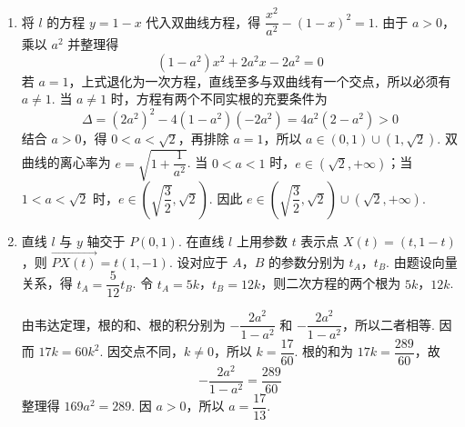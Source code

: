 \begin{solution}
\begin{enumerate}
\item 将 \(l\) 的方程 \(y=1-x\) 代入双曲线方程，得 \(\dfrac{x^2}{a^2}-(1-x)^2=1\). 由于 \(a>0\)，乘以 \(a^2\) 并整理得
\[
(1-a^2)x^2+2a^2x-2a^2=0
\]
若 \(a=1\)，上式退化为一次方程，直线至多与双曲线有一个交点，所以必须有 \(a\ne1\). 当 \(a\ne1\) 时，方程有两个不同实根的充要条件为
\[
\Delta=(2a^2)^2-4(1-a^2)(-2a^2)=4a^2(2-a^2)>0
\]
结合 \(a>0\)，得 \(0<a<\sqrt2\)，再排除 \(a=1\)，所以 \(a\in(0,1)\cup(1,\sqrt2)\). 双曲线的离心率为 \(e=\sqrt{1+\dfrac1{a^2}}\). 当 \(0<a<1\) 时，\(e\in(\sqrt2,+\infty)\)；当 \(1<a<\sqrt2\) 时，\(e\in\left(\sqrt{\dfrac32},\sqrt2\right)\). 因此 \(e\in\left(\sqrt{\dfrac32},\sqrt2\right)\cup\left(\sqrt2,+\infty\right)\).
\item 直线 \(l\) 与 \(y\) 轴交于 \(P(0,1)\). 在直线 \(l\) 上用参数 \(t\) 表示点 \(X(t)=(t,1-t)\)，则 \(\overrightarrow{PX(t)}=t(1,-1)\). 设对应于 \(A\)，\(B\) 的参数分别为 \(t_A\)，\(t_B\). 由题设向量关系，得 \(t_A=\dfrac5{12}t_B\). 令 \(t_A=5k\)，\(t_B=12k\)，则二次方程的两个根为 \(5k\)，\(12k\).

由韦达定理，根的和、根的积分别为 \(-\dfrac{2a^2}{1-a^2}\) 和 \(-\dfrac{2a^2}{1-a^2}\)，所以二者相等. 因而 \(17k=60k^2\). 因交点不同，\(k\ne0\)，所以 \(k=\dfrac{17}{60}\). 根的和为 \(17k=\dfrac{289}{60}\)，故
\[
-\frac{2a^2}{1-a^2}=\frac{289}{60}
\]
整理得 \(169a^2=289\). 因 \(a>0\)，所以 \(a=\dfrac{17}{13}\).
\end{enumerate}
\end{solution}
